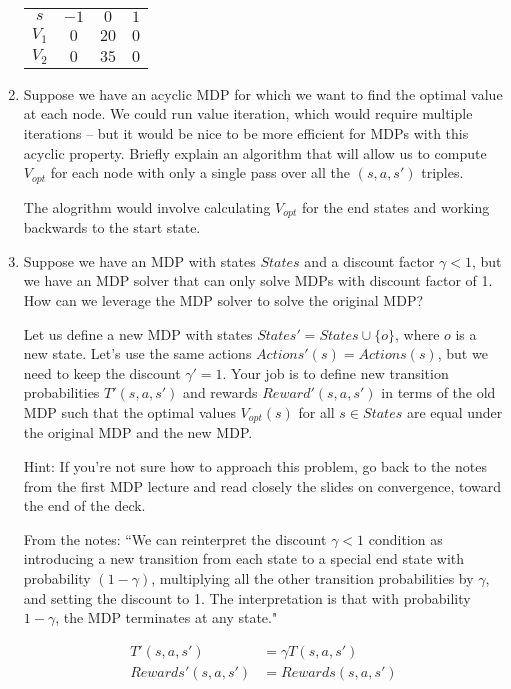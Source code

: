 \documentclass[10pt]{article}
\begin{document}
\begin{enumerate}[label=(\alph*)]
	\begin{tabular}{c | c c c}
		$s$ & $-1$ & $0$ & $1$\\
  		$V_1$ & $0$ & $20$ & $0$\\
  		$V_2$ & $0$ & $35$ & $0$\\
  	\end{tabular}
  
  \item Suppose we have an acyclic MDP for which we want to find the optimal value at each node. We could run value iteration, which would require multiple iterations -- but it would be nice to be more efficient for MDPs with this acyclic property. Briefly explain an algorithm that will allow us to compute $V_{opt}$ for each node with only a single pass over all the $(s,a,s')$ triples.
  
  The alogrithm would involve calculating $V_{opt}$ for the end states and working backwards to the start state.
  
  \item Suppose we have an MDP with states $States$ and a discount factor $\gamma < 1$, but we have an MDP solver that can only solve MDPs with discount factor of 1. How can we leverage the MDP solver to solve the original MDP?
  
  Let us define a new MDP with states $States'= States \cup \{o\}$, where $o$ is a new state. Let's use the same actions $Actions'(s) = Actions(s)$, but we need to keep the discount $\gamma' = 1$. Your job is to define new transition probabilities $T'(s,a,s')$ and rewards $Reward'(s,a,s')$ in terms of the old MDP such that the optimal values $V_{opt}(s)$ for all $s \in States$ are equal under the original MDP and the new MDP.
  
  Hint: If you're not sure how to approach this problem, go back to the notes from the first MDP lecture and read closely the slides on convergence, toward the end of the deck.
  
  From the notes: ``We can reinterpret the discount $\gamma < 1$ condition as introducing a new transition from each state to a special end state with probability $(1 - \gamma)$, multiplying all the other transition probabilities by $\gamma$, and setting the discount to 1. The interpretation is that with probability $1 - \gamma$, the MDP terminates at any state."
  
  \begin{align*}
  		T'(s,a,s') &= \gamma T(s,a,s')\\
  		Rewards'(s,a,s') &= Rewards(s,a,s')
  \end{align*}

\end{enumerate}
\end{document}
